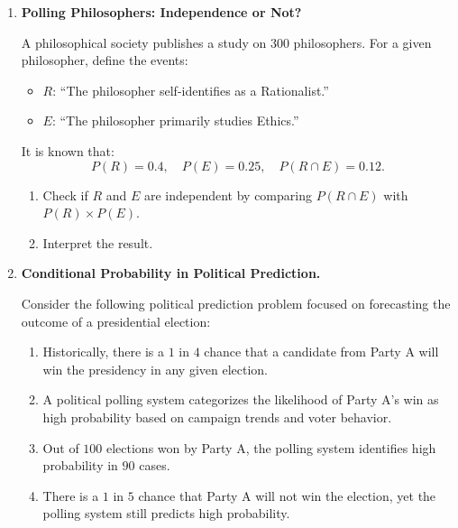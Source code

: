 \documentclass[12pt]{article}
\newif\ifsolutions
\begin{document}
\begin{enumerate}
    \item \textbf{Polling Philosophers: Independence or Not?}
    
    A philosophical society publishes a study on 300 philosophers. For a given philosopher, define the events:
    \begin{itemize}[noitemsep]
        \item \( R \): “The philosopher self-identifies as a Rationalist.”
        \item \( E \): “The philosopher primarily studies Ethics.”
    \end{itemize}
    It is known that:
    \[
    P(R)=0.4,\quad P(E)=0.25,\quad P(R \cap E)=0.12.
    \]
    
    \begin{enumerate}[label=(\alph*)]
        \item Check if \( R \) and \( E \) are independent by comparing \( P(R \cap E) \) with \( P(R) \times P(E) \).
        \item Interpret the result.
    \end{enumerate}

    \ifsolutions \color{blue} \textbf{Solution:} \\
    \begin{enumerate}[label=(\alph*)]
        \item Given that $P(R \cap E)=0.12.$ and $P(R) \times P(E) = 0.4 \times 0.25= 0.1.$, we can conclude that the events \( R \) and \( E \) are \textbf{not independent}.
        
        \item This indicates that there is a relationship between a philosopher identifying as a Rationalist and focusing on Ethics; knowing that one of these events happened changes the probability of the other one.
    \end{enumerate}
    \fi \color{black}

    \item \textbf{Conditional Probability in Political Prediction.}    

    Consider the following political prediction problem focused on forecasting the outcome of a presidential election:
    
    \begin{enumerate}[label=(\roman*)]
        \item Historically, there is a \(1\) in \(4\) chance that a candidate from Party A will win the presidency in any given election.
        \item A political polling system categorizes the likelihood of Party A’s win as high probability based on campaign trends and voter behavior.
        \item Out of \(100\) elections won by Party A, the polling system identifies high probability in \(90\) cases.
        \item There is a \(1\) in \(5\) chance that Party A will not win the election, yet the polling system still predicts high probability.
    \end{enumerate}
    

\end{enumerate}
\end{document}
